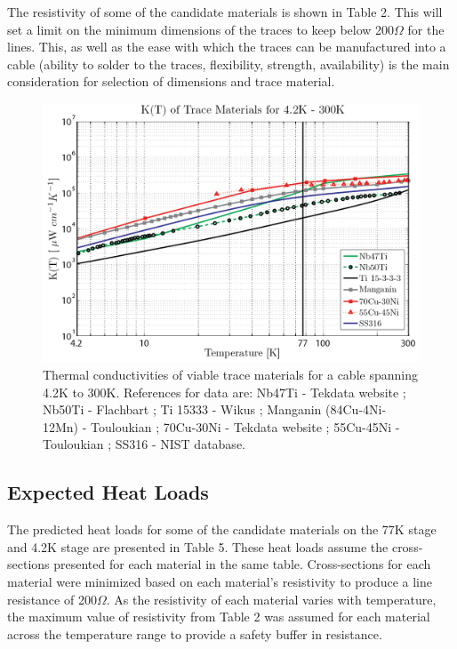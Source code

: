 \documentclass{article}
\begin{document}

The resistivity of some of the candidate materials is shown in Table 2. This will set a limit on the minimum dimensions of the traces to keep below 200$\Omega$ for the lines. This, as well as the ease with which the traces can be manufactured into a cable (ability to solder to the traces, flexibility, strength, availability) is the main consideration for selection of dimensions and trace material.

\begin{figure}
\includegraphics[width = .65\textwidth]{Trace_matl_300K.png}
\caption{Thermal conductivities of viable trace materials for a cable spanning 4.2K to 300K. References for data are: \newline Nb47Ti - Tekdata website ; Nb50Ti - Flachbart \cite{Flachbart1978} ; Ti 15333 - Wikus \cite{wik} ; Manganin (84Cu-4Ni-12Mn) - Touloukian \cite{tou} ; 70Cu-30Ni - Tekdata website ; 55Cu-45Ni - Touloukian \cite{tou} ; SS316 - NIST database.}
\end{figure}

\subsection{Expected Heat Loads}

The predicted heat loads for some of the candidate materials on the 77K stage and 4.2K stage are presented in Table 5. These heat loads assume the cross-sections presented for each material in the same table. Cross-sections for each material were minimized based on each material's resistivity to produce a line resistance of 200$\Omega$. As the resistivity of each material varies with temperature, the maximum value of resistivity from Table 2 was assumed for each material across the temperature range to provide a safety buffer in resistance.
\end{document}
